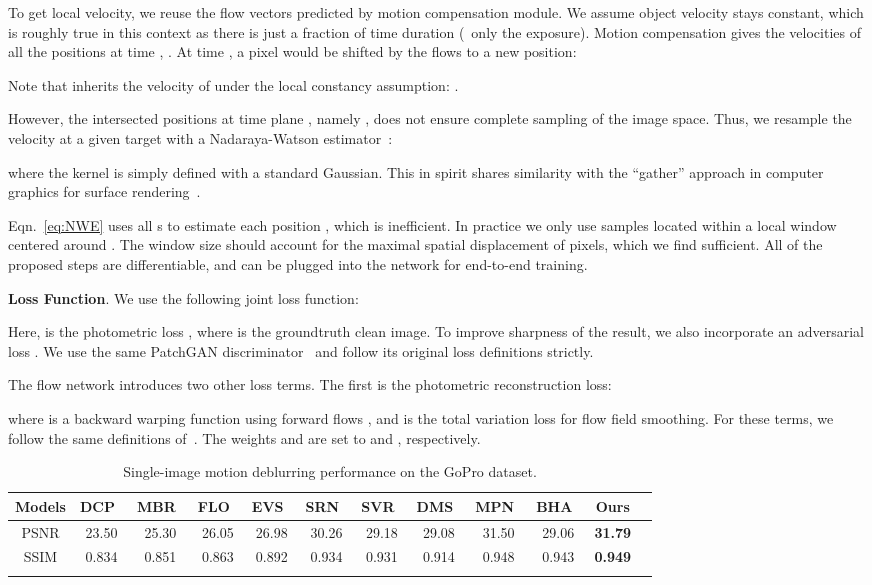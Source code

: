 \documentclass[10pt,twocolumn,letterpaper]{article}
\begin{document}
To get local velocity, we reuse the flow vectors predicted by motion compensation module. We assume object velocity stays constant, which is roughly true in this context as there is just a fraction of time duration (\ie~only  the exposure). Motion compensation gives the velocities of all the positions  at time , . At time , a pixel  would be shifted by the flows to a new position:


Note that  inherits the velocity of  under the local constancy assumption: .

However, the intersected positions at time plane , namely , does not ensure complete sampling of the image space. Thus, we resample the velocity at a given target  with a Nadaraya-Watson estimator~\cite{NWEstimiator}:

where the kernel  is simply defined with a standard Gaussian. This in spirit shares similarity with the ``gather'' approach in computer graphics for surface rendering~\cite{YuTOG2013}.

Eqn.~\eqref{eq:NWE} uses all s to estimate each position , which is inefficient. In practice we only use samples located within a local  window centered around . The window size  should account for the maximal spatial displacement of pixels, which we find  sufficient. All of the proposed steps are differentiable, and can be plugged into the network for end-to-end training.


\textbf{Loss Function}.
We use the following joint loss function: 

Here,  is the photometric  loss , where  is the groundtruth clean image. To improve sharpness of the result, we also incorporate an adversarial loss . We use the same PatchGAN discriminator~\cite{IsolaCVPR17} and follow its original loss definitions strictly.

The flow network introduces two other loss terms. The first  is the photometric reconstruction loss: 

where  is a backward warping function using forward flows , and  is the total variation loss for flow field smoothing. For these terms, we follow the same definitions of~\cite{JiangCVPR18}. The weights  and  are set to  and , respectively.

\begin{table*}[t!]
	\centering
	\small
	\caption{Single-image motion deblurring performance on the GoPro dataset.}
	\begin{tabular}{cccccccccccc}
		\toprule
		Models & DCP~\cite{PanCVPR16} & MBR~\cite{SunCVPR15} & FLO~\cite{GongCVPR17} & EVS~\cite{JinCVPR18} & SRN~\cite{TaoCVPR18} & SVR~\cite{ZhangCVPR18} & DMS~\cite{NahCVPR17} & MPN~\cite{ZhangCVPR19} & BHA~\cite{PanCVPR19} & Ours \\
		\midrule
		PSNR & 23.50 & 25.30 & 26.05 & 26.98 & 30.26 & 29.18 & 29.08 & 31.50 & 29.06 & \textbf{31.79} \\
		SSIM & 0.834 & 0.851 & 0.863 & 0.892 & 0.934 & 0.931 & 0.914 & 0.948 & 0.943 & \textbf{0.949} \\
		\bottomrule
		\label{tab:gopro_image_metrics}
	\end{tabular}
	\vspace{-5mm}
\end{table*}
\end{document}
